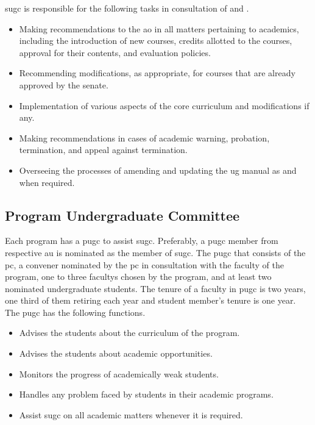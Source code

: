 \acrshort{sugc} is responsible for the following tasks in consultation of  and .

\begin{itemize}[leftmargin=15mm]
	\item Making recommendations to the \acrshort{ao} in  all matters pertaining to academics, including the introduction of new courses, credits allotted to the courses, approval for their contents, and evaluation policies.
	\item Recommending modifications, as appropriate, for courses that are already approved by the \gls{senate}.
	\item Implementation of various aspects of the core curriculum and modifications if any.
	\item Making recommendations in cases of academic warning, probation, termination, and appeal against termination.
	\item Overseeing the processes of amending and updating the \acrshort{ug} manual as and when required. 
\end{itemize}

\subsection{Program Undergraduate Committee \label{lab:PUGC}}

Each \gls{program} has a \acrfull{pugc} to assist \acrshort{sugc}. Preferably, a \acrshort{pugc} member from respective \acrshort{au} is nominated as the member of \acrshort{sugc}. The \acrfull{pugc} that consists of the \Gls{pc}, a convener nominated by the \acrshort{pc} in consultation with the \gls{faculty} of the \gls{program}, one to three \glspl{faculty} chosen by the \gls{program}, and at least two nominated undergraduate \glspl{student}. The tenure of a \gls{faculty} in \acrshort{pugc} is two years, one third of them retiring each year and student member’s tenure is one year. The \acrshort{pugc} has the following functions.

\begin{itemize}[leftmargin=15mm]
	\item Advises the \glspl{student} about the curriculum of the program. 
	\item Advises the \glspl{student} about academic opportunities. 
	\item Monitors the progress of academically weak \glspl{student}. 
	\item Handles any problem faced by \glspl{student} in their academic programs.
	\item Assist \acrshort{sugc} on all academic matters whenever it is required.
\end{itemize}

